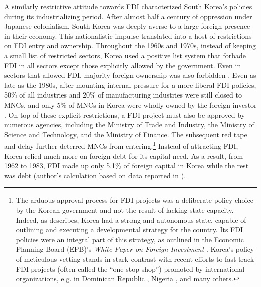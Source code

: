 A similarly restrictive attitude towards FDI characterized South Korea's
policies during its industrializing period. After almost half a century of
oppression under Japanese colonialism, South Korea was deeply averse to a large
foreign presence in their economy. This nationalistic impulse translated into a
host of restrictions on FDI entry and ownership. Throughout the 1960s and 1970s,
instead of keeping a small list of restricted sectors, Korea used a positive
list system that forbade FDI in all sectors except those explicitly allowed by
the government. Even in sectors that allowed FDI, majority foreign ownership was
also forbidden \citep{Thurbon2006}. Even as late as the 1980s, after mounting
internal pressure for a more liberal FDI policies, 50\% of all industries and
20\% of manufacturing industries were still closed to MNCs, and only 5\% of MNCs
in Korea were wholly owned by the foreign investor \citep{Chang2004}. On top of
these explicit restrictions, a FDI project must also be approved by numerous
agencies, including the Ministry of Trade and Industry, the Ministry of Science
and Technology, and the Ministry of Finance. The subsequent red tape and delay
further deterred MNCs from entering.\footnote{The arduous approval process for
  FDI projects was a deliberate policy choice by the Korean government and not
  the result of lacking state capacity. Indeed, as \citet{Evans1995} describes,
  Korea had a strong and autonomous state, capable of outlining and executing a
  developmental strategy for the country. Its FDI policies were an integral part
  of this strategy, as outlined in the Economic Planning Board (EPB)'s
  \textit{White Paper on Foreign Investment} \citep{EPB1981}. Korea's policy of
  meticulous vetting stands in stark contrast with recent efforts to fast track
  FDI projects (often called the ``one-stop shop'') promoted by international
  organizations, e.g. in Dominican Republic \citep{UNCTAD2016}, Nigeria
  \citep{UNCTAD-Nigeria2009}, and many others.} Instead of attracting FDI, Korea
relied much more on foreign debt for its capital need. As a result, from 1962 to
1983, FDI made up only 5.1\% of foreign capital in Korea while the rest was
debt (author's calculation based on data reported in \citet[92, Table
4.5]{Amsden1989}).

